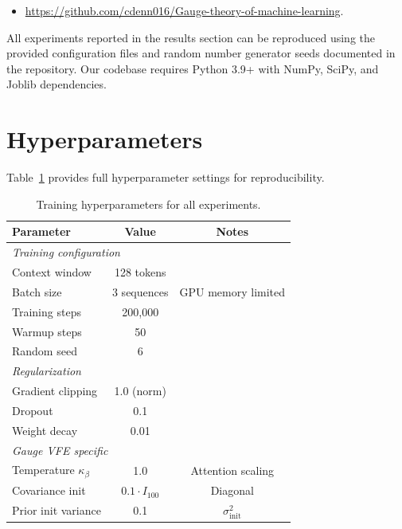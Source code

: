 \documentclass[twoside,11pt]{article}
\begin{document}
\begin{itemize}
\item \href{https://github.com/cdenn016/Gauge-theory-of-machine-learning}{https://github.com/cdenn016/Gauge-theory-of-machine-learning}. 
\end{itemize}

All experiments reported in the results section can be reproduced using the provided configuration files and random number generator seeds documented in the repository. Our codebase requires Python 3.9+ with NumPy, SciPy, and Joblib dependencies.


\appendix

\section{Hyperparameters}
\label{app:hyperparams}

Table~\ref{tab:hyperparams} provides full hyperparameter settings for reproducibility.

\begin{table}[h]
\centering
\small
\caption{Training hyperparameters for all experiments.}
\label{tab:hyperparams}
\begin{tabular}{lcc}
\toprule
\textbf{Parameter} & \textbf{Value} & \textbf{Notes} \\
\midrule
\multicolumn{3}{l}{\textit{Training configuration}} \\
\quad Context window & 128 tokens & \\
\quad Batch size & 3 sequences & GPU memory limited \\
\quad Training steps & 200,000 & \\
\quad Warmup steps & 50 & \\
\quad Random seed & 6 & \\
\midrule
\multicolumn{3}{l}{\textit{Regularization}} \\
\quad Gradient clipping & 1.0 (norm) & \\
\quad Dropout & 0.1 & \\
\quad Weight decay & 0.01 & \\
\midrule
\multicolumn{3}{l}{\textit{Gauge VFE specific}} \\
\quad Temperature $\kappa_\beta$ & 1.0 & Attention scaling \\
\quad Covariance init & $0.1 \cdot I_{100}$ & Diagonal \\
\quad Prior init variance & 0.1 & $\sigma_{\text{init}}^2$ \\
\bottomrule
\end{tabular}
\end{table}
\end{document}
